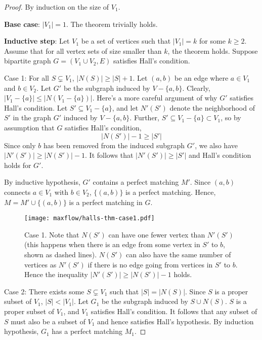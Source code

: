 \begin{proof}
    By induction on the size of $V_1$.

    \textbf{Base case}: $|V_1| = 1$. The theorem trivially holds.

    \textbf{Inductive step}: Let $V_1$ be a set of vertices such that $|V_1|=k$ for some $k \geq 2$. Assume that for all vertex sets of size smaller than $k$, the theorem holds. Suppose bipartite graph $G = (V_1\cup V_2, E)$ satisfies Hall's condition.

    Case 1: For all $S \subsetneq V_1$, $|N(S)| \geq |S| + 1$. Let $(a,b)$ be an edge where $a \in V_1$ and $b \in V_2$. Let $G'$ be the subgraph induced by $V-\{a,b\}$. Clearly, $|V_1-\{a\}| \leq |N(V_1-\{a\})|$. Here's a more careful argument of why $G'$ satisfies Hall's condition. Let $S' \subseteq V_1-\{a\}$, and let $N'(S')$ denote the neighborhood of $S'$ in the graph $G'$ induced by $V-\{a,b\}$. Further, $S' \subseteq V_1-\{a\} \subset V_1$, so by assumption that $G$ satisfies Hall's condition,
    $$
    |N(S')| - 1 \geq |S'|
    $$
    Since only $b$ has been removed from the induced subgraph $G'$, we also have $|N'(S')| \geq |N(S')|-1$. It follows that $|N'(S')| \geq |S'|$ and Hall's condition holds for $G'$.
    
    By inductive hypothesis, $G'$ contains a perfect matching $M'$. Since $(a,b)$ connects $a \in V_1$ with $b \in V_2$, $\{(a,b)\}$ is a perfect matching. Hence, $M = M' \cup \{(a,b)\}$ is a perfect matching in $G$.

    \begin{figure}[htbp]
        \centering
        \texttt{[image: maxflow/halls-thm-case1.pdf]}
        \caption{Case 1. Note that $N(S')$ can have one fewer vertex than $N'(S')$ (this happens when there is an edge from some vertex in $S'$ to $b$, shown as dashed lines). $N(S')$ can also have the same number of vertices as $N'(S')$ if there is no edge going from vertices in $S'$ to $b$. Hence the inequality $|N'(S')| \geq |N(S')|-1$ holds. }
        \label{fig:halls-thm-case1}
    \end{figure}

    Case 2: There exists some $S \subsetneq V_1$ such that $|S| = |N(S)|$. Since $S$ is a proper subset of $V_1$, $|S| < |V_1|$. Let $G_1$ be the subgraph induced by $S \cup N(S)$. $S$ is a proper subset of $V_1$, and $V_1$ satisfies Hall's condition. It follows that any subset of $S$ must also be a subset of $V_1$ and hence satisfies Hall's hypothesis. By induction hypothesis, $G_1$ has a perfect matching $M_1$.


\end{proof}
